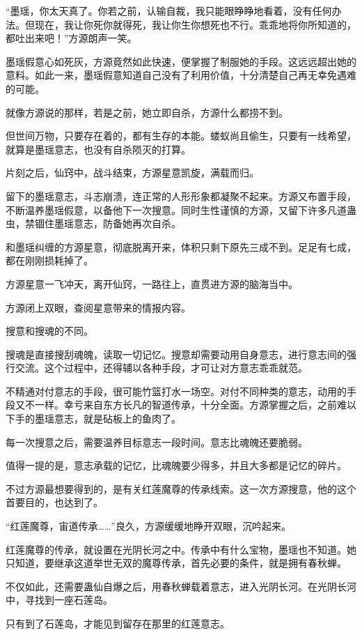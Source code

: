 \begin{this_body}
“墨瑶，你太天真了。你若之前，认输自裁，我只能眼睁睁地看着，没有任何办法。但现在，我让你死你就得死，我让你生你想死也不行。乖乖地将你所知道的，都吐出来吧！”方源朗声一笑。

墨瑶假意心如死灰，方源竟然如此快速，便掌握了制服她的手段。这远远超出她的意料。如此一来，墨瑶假意知道自己没有了利用价值，十分清楚自己再无幸免遇难的可能。

就像方源说的那样，若是之前，她立即自杀，方源什么都捞不到。

但世间万物，只要存在着的，都有生存的本能。蝼蚁尚且偷生，只要有一线希望，就算是墨瑶意志，也没有自杀陨灭的打算。

片刻之后，仙窍中，战斗结束，方源星意凯旋，满载而归。

留下的墨瑶意志，斗志崩溃，连正常的人形形象都凝聚不起来。方源又布置手段，不断温养墨瑶假意，以备他下一次搜意。同时生性谨慎的方源，又留下许多凡道蛊虫，禁锢住墨瑶意志，防备她再次自杀。

和墨瑶纠缠的方源星意，彻底脱离开来，体积只剩下原先三成不到。足足有七成，都在刚刚损耗掉了。

方源星意一飞冲天，离开仙窍，一路往上，直贯进方源的脑海当中。

方源闭上双眼，查阅星意带来的情报内容。

搜意和搜魂的不同。

搜魂是直接搜刮魂魄，读取一切记忆。搜意却需要动用自身意志，进行意志间的强行交流。这个过程中，还得辅以各种手段，才可让对方意志乖乖就范。

不精通对付意志的手段，很可能竹篮打水一场空。对付不同种类的意志，动用的手段又不一样。幸亏来自东方长凡的智道传承，十分全面。方源掌握之后，之前难以下手的墨瑶意志，就是砧板上的鱼肉了。

每一次搜意之后，需要温养目标意志一段时间。意志比魂魄还要脆弱。

值得一提的是，意志承载的记忆，比魂魄要少得多，并且大多都是记忆的碎片。

不过方源最想要得到的，是有关红莲魔尊的传承线索。这一次方源搜意，他的这个首要目的，也达到了。

“红莲魔尊，宙道传承……”良久，方源缓缓地睁开双眼，沉吟起来。

红莲魔尊的传承，就设置在光阴长河之中。传承中有什么宝物，墨瑶也不知道。她只知道，要继承这道举世无双的魔尊传承，首先必要的条件，就是拥有春秋蝉。

不仅如此，还需要蛊仙自爆之后，用春秋蝉载着意志，进入光阴长河。在光阴长河中，寻找到一座石莲岛。

只有到了石莲岛，才能见到留存在那里的红莲意志。


\end{this_body}
